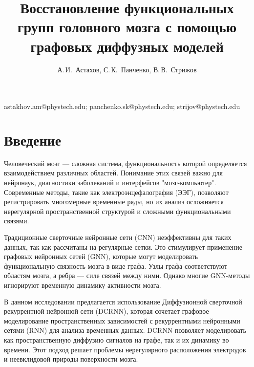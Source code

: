 \documentclass[12pt, twoside]{article}
\begin{document}
\title
    {Восстановление функциональных групп головного мозга с помощью графовых диффузных моделей}
\author
    {А.\,И.~Астахов, С.\,К.~Панченко, В.\,В.~Стрижов} 
\email
    {astakhov.am@phystech.edu; panchenko.sk@phystech.edu; strijov@phystech.edu}

\maketitle
\par

\section{Введение}

Человеческий мозг — сложная система, функциональность которой определяется взаимодействием различных областей. Понимание этих связей важно для нейронаук, диагностики заболеваний и интерфейсов "мозг-компьютер". Современные методы, такие как электроэнцефалография (ЭЭГ), позволяют регистрировать многомерные временные ряды, но их анализ осложняется нерегулярной пространственной структурой и сложными функциональными связями.

Традиционные сверточные нейронные сети (CNN) неэффективны для таких данных, так как рассчитаны на регулярные сетки. Это стимулирует применение графовых нейронных сетей (GNN), которые могут моделировать функциональную связность мозга в виде графа. Узлы графа соответствуют областям мозга, а ребра — силе связей между ними. Однако многие GNN-методы игнорируют временную динамику активности мозга.

В данном исследовании предлагается использование Диффузионной сверточной рекуррентной нейронной сети (DCRNN), которая сочетает графовое моделирование пространственных зависимостей с рекуррентными нейронными сетями (RNN) для анализа временных данных. DCRNN позволяет моделировать как пространственную диффузию сигналов на графе, так и их динамику во времени. Этот подход решает проблемы нерегулярного расположения электродов и неевклидовой природы поверхности мозга.
\end{document}
